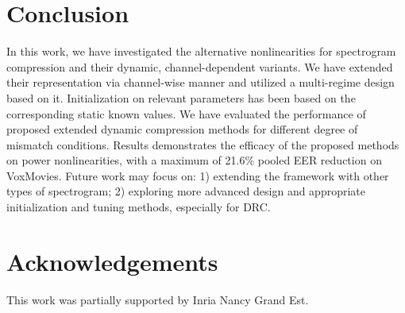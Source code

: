 \documentclass{article}
\begin{document}
\section{Conclusion}
\label{sec:conclusion}
In this work, we have investigated the alternative nonlinearities for spectrogram compression and their dynamic, channel-dependent variants. We have extended their representation via channel-wise manner and utilized a multi-regime design based on it. Initialization on relevant parameters has been based on the corresponding static known values. We have evaluated the performance of proposed extended dynamic compression methods  for different degree of mismatch conditions. Results demonstrates the efficacy of the proposed methods on power nonlinearities, with a maximum of 21.6\% pooled EER reduction on VoxMovies. Future work may focus on: 1) extending the framework with other types of spectrogram; 2) exploring more advanced design and appropriate initialization and tuning methods, especially for DRC.



\section{Acknowledgements}
This work was partially supported by Inria Nancy Grand Est.
\end{document}
